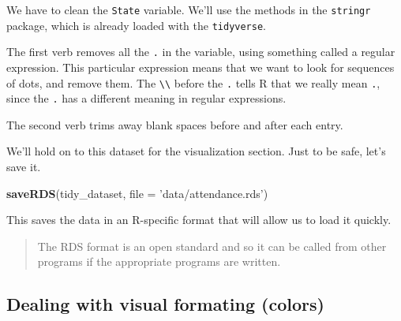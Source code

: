 \documentclass[12pt,letterpaperpaper,openany]{book}
\newenvironment{Shaded}{\begin{snugshade}}{\end{snugshade}}
\newcommand{\CharTok}[1]{\textcolor[rgb]{0.31,0.60,0.02}{#1}}
\newcommand{\DataTypeTok}[1]{\textcolor[rgb]{0.13,0.29,0.53}{#1}}
\newcommand{\KeywordTok}[1]{\textcolor[rgb]{0.13,0.29,0.53}{\textbf{#1}}}
\newcommand{\NormalTok}[1]{#1}
\newcommand{\OperatorTok}[1]{\textcolor[rgb]{0.81,0.36,0.00}{\textbf{#1}}}
\newcommand{\StringTok}[1]{\textcolor[rgb]{0.31,0.60,0.02}{#1}}
\begin{document}
We have to clean the \texttt{State} variable. We'll use the methods in the \texttt{stringr}
package, which is already loaded with the \texttt{tidyverse}.

\begin{Shaded}
\end{Shaded}

The first verb removes all the \texttt{.} in the variable, using something called a regular expression.
This particular expression means that we want to look for sequences of dots, and remove them.
The \texttt{\textbackslash{}\textbackslash{}} before the \texttt{.} tells R that we really mean \texttt{.}, since the \texttt{.} has a different meaning in
regular expressions.

The second verb trims away blank spaces before and after each entry.

We'll hold on to this dataset for the visualization section. Just to be safe, let's
save it.

\begin{Shaded}
\begin{Highlighting}[]
\KeywordTok{saveRDS}\NormalTok{(tidy_dataset, }\DataTypeTok{file =} \StringTok{'data/attendance.rds'}\NormalTok{)}
\end{Highlighting}
\end{Shaded}

This saves the data in an R-specific format that will allow us to load it quickly.

\begin{quote}
The RDS format is an open standard and so it can be called from other programs if the
appropriate programs are written.
\end{quote}

\hypertarget{dealing-with-visual-formating-colors}{%
\subsection*{Dealing with visual formating (colors)}\label{dealing-with-visual-formating-colors}}
\end{document}

